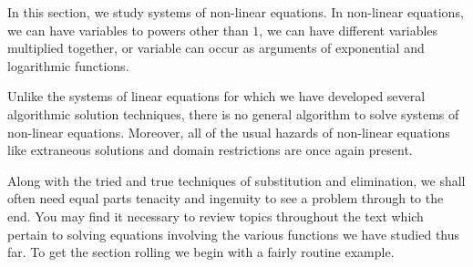 \documentclass{ximera}
\begin{document}
	\author{Stitz-Zeager}




\setcounter{footnote}{0}

\label{NonLinearEquations}

In this section, we study systems of non-linear equations.   In non-linear equations, we can have variables to powers other than $1$, we can have different variables multiplied together, or variable can occur as arguments of exponential and logarithmic functions. 

Unlike the systems of linear equations for which we have developed several algorithmic solution techniques, there is no general algorithm to solve systems of non-linear equations.  Moreover, all of the usual hazards of non-linear equations like extraneous solutions and  domain restrictions are once again present.  

Along with the tried and true techniques of substitution and elimination, we shall often need equal parts tenacity and ingenuity to see a problem through to the end.  You may find it necessary to review topics throughout the text which pertain to solving equations involving the various functions we have studied thus far.  To get the section rolling we begin with a fairly routine example.
\end{document}
